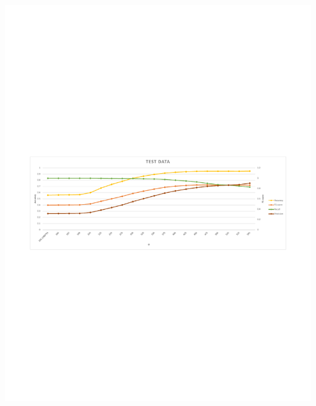 \documentclass[xelatex,usenames,dvipsnames]{beamer}
\begin{document}
\begin{frame}[standout]
    \includegraphics[width = \textwidth]{figs/Edge_Test_Results.pdf}
  
  
  
    
  
  \end{frame}


\end{document}
